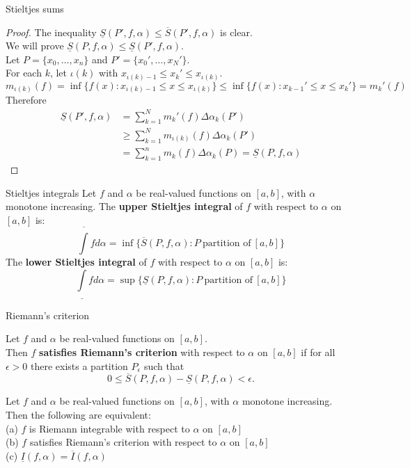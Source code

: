 \documentclass{beamer}
\begin{document}
\begin{frame}{Stieltjes sums}
\begin{proof}
The inequality $\underline{S}(P',f,\alpha) \leq \overline{S}(P',f,\alpha)$ is clear.\\
\pause
We will prove $\underline{S}(P,f,\alpha) \leq \underline{S}(P',f,\alpha)$.\\
\pause
Let $P=\{x_0,\dots, x_n\}$ and $P'=\{x_0',\dots, x_N'\}$.\\
\pause
For each $k$, let $\iota(k)$ with $x_{\iota(k)-1} \leq x_k'\leq x_{\iota(k)}$.\\
\pause
{
\tiny
$$m_{\iota(k)}(f)=\inf\{f(x): x_{\iota(k)-1}\leq x\leq x_{\iota(k)}\}\leq \inf\{f(x): x_{k-1}'\leq x\leq x_k'\}=m_k'(f)$$
}
\pause
Therefore 
{\tiny
\begin{align*}
\underline{S}(P',f,\alpha)
 &=    \sum_{k=1}^N m_k'(f)\Delta\alpha_k(P')\\
 &\geq \sum_{k=1}^N m_{\iota(k)}(f)\Delta\alpha_k(P')\\
 & = \sum_{k=1}^n m_{k}(f)\Delta\alpha_k(P) = \underline{S}(P,f,\alpha)
\end{align*}
}
\end{proof}
\end{frame}

\begin{frame}{Stieltjes integrals}
Let $f$ and $\alpha$ be real-valued functions on $[a,b]$, with $\alpha$ monotone increasing.
\pause
The \textbf{upper Stieltjes integral} of $f$ with respect to $\alpha$ on $[a,b]$ is:
$$\overline{\int} fd\alpha = \inf\{\overline{S}(P,f,\alpha): P\ \text{partition of}\ [a,b]\}$$
\pause
The \textbf{lower Stieltjes integral} of $f$ with respect to $\alpha$ on $[a,b]$ is:
$$\underline{\int} fd\alpha = \sup\{\underline{S}(P,f,\alpha): P\ \text{partition of}\ [a,b]\}$$
\end{frame}

\begin{frame}{Riemann's criterion}
\begin{defn}
Let $f$ and $\alpha$ be real-valued functions on $[a,b]$.\\
Then $f$ \textbf{satisfies Riemann's criterion} with respect to $\alpha$ on $[a,b]$ if for all $\epsilon > 0$ there exists a partition $P_\epsilon$ such that
$$0\leq \overline S(P,f,\alpha)-\underline S(P,f,\alpha) < \epsilon.$$
\end{defn}
\pause
\begin{thm}
Let $f$ and $\alpha$ be real-valued functions on $[a,b]$, with $\alpha$ monotone increasing.  Then the following are equivalent:\\
\pause
(a) $f$ is Riemann integrable with respect to $\alpha$ on $[a,b]$\\
\pause
(b) $f$ satisfies Riemann's criterion with respect to $\alpha$ on $[a,b]$\\
\pause
(c) $\underline I(f,\alpha) = \overline I(f,\alpha)$
\end{thm}
\end{frame}
\end{document}
